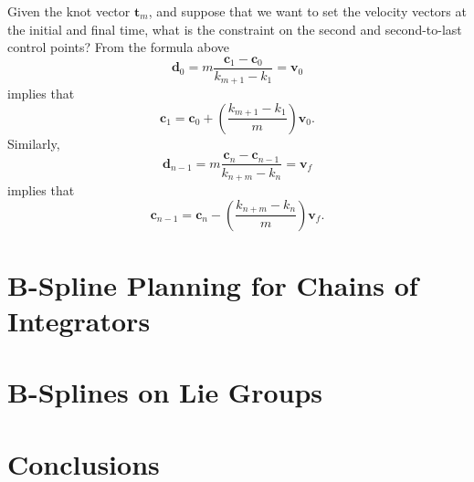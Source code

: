 \documentclass{article}
\begin{document}
Given the knot vector $\mathbf{t}_m$, and suppose that we want to set the velocity vectors at the initial and final time, what is the constraint on the second and second-to-last control points?
From the formula above
\[
\mathbf{d}_0 = m\frac{\mathbf{c}_1 - \mathbf{c}_0}{k_{m+1}-k_1} = \mathbf{v}_0
\]
implies that
\[
\mathbf{c}_1 = \mathbf{c}_0 + \left(\frac{k_{m+1}-k_1}{m}\right) \mathbf{v}_0.
\]
Similarly, 
\[
\mathbf{d}_{n-1} = m\frac{\mathbf{c}_n - \mathbf{c}_{n-1}}{k_{n+m}-k_n} = \mathbf{v}_f
\]
implies that
\[
\mathbf{c}_{n-1} = \mathbf{c}_n - \left(\frac{k_{n+m}-k_n}{m}\right)\mathbf{v}_f.
\]


\section{B-Spline Planning for Chains of Integrators}

\section{B-Splines on Lie Groups}










\section{Conclusions}
\label{sec:conclusion}




\end{document}
